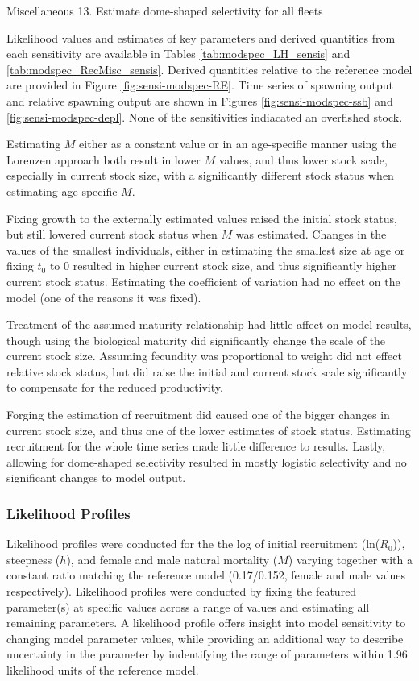 \documentclass[11pt,
  english,
  letterpaper,
]{article}
\begin{document}
Miscellaneous 13. Estimate dome-shaped selectivity for all fleets

Likelihood values and estimates of key parameters and derived quantities from each sensitivity are available in Tables \ref{tab:modspec_LH_sensis} and \ref{tab:modspec_RecMisc_sensis}. Derived quantities relative to the reference model are provided in Figure \ref{fig:sensi-modspec-RE}. Time series of spawning output and relative spawning output are shown in Figures \ref{fig:sensi-modspec-ssb} and \ref{fig:sensi-modspec-depl}. None of the sensitivities indiacated an overfished stock.

Estimating \(M\) either as a constant value or in an age-specific manner using the Lorenzen approach both result in lower \(M\) values, and thus lower stock scale, especially in current stock size, with a significantly different stock status when estimating age-specific \(M\).

Fixing growth to the externally estimated values raised the initial stock status, but still lowered current stock status when \(M\) was estimated. Changes in the values of the smallest individuals, either in estimating the smallest size at age or fixing \(t_0\) to 0 resulted in higher current stock size, and thus significantly higher current stock status. Estimating the coefficient of variation had no effect on the model (one of the reasons it was fixed).

Treatment of the assumed maturity relationship had little affect on model results, though using the biological maturity did significantly change the scale of the current stock size. Assuming fecundity was proportional to weight did not effect relative stock status, but did raise the initial and current stock scale significantly to compensate for the reduced productivity.

Forging the estimation of recruitment did caused one of the bigger changes in current stock size, and thus one of the lower estimates of stock status. Estimating recruitment for the whole time series made little difference to results. Lastly, allowing for dome-shaped selectivity resulted in mostly logistic selectivity and no significant changes to model output.

\hypertarget{likelihood-profiles}{%
\subsubsection{Likelihood Profiles}\label{likelihood-profiles}}

Likelihood profiles were conducted for the the log of initial recruitment (ln(\(R_0\))), steepness (\(h\)), and female and male natural mortality (\(M\)) varying together with a constant ratio matching the reference model (0.17/0.152, female and male values respectively). Likelihood profiles were conducted by fixing the featured parameter(s) at specific values across a range of values and estimating all remaining parameters. A likelihood profile offers insight into model sensitivity to changing model parameter values, while providing an additional way to describe uncertainty in the parameter by indentifying the range of parameters within 1.96 likelihood units of the reference model.
\end{document}
